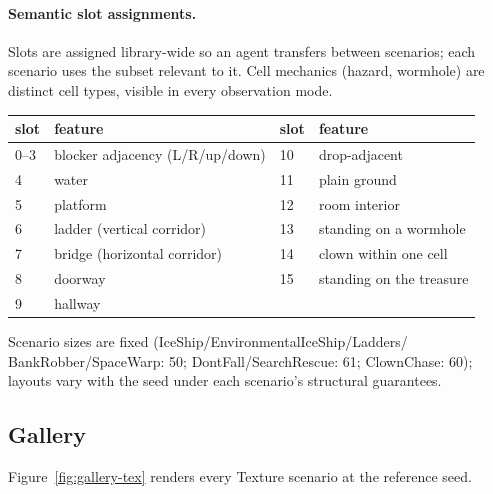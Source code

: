 \documentclass[11pt]{article}
\begin{document}
\paragraph{Semantic slot assignments.} Slots are assigned
library-wide so an agent transfers between scenarios; each scenario
uses the subset relevant to it. Cell mechanics (hazard, wormhole) are
distinct cell types, visible in every observation mode.

\begin{center}
\small
\begin{tabular}{@{}llll@{}}
\toprule
\textbf{slot} & \textbf{feature} & \textbf{slot} & \textbf{feature} \\
\midrule
0--3 & blocker adjacency (L/R/up/down) & 10 & drop-adjacent \\
4 & water & 11 & plain ground \\
5 & platform & 12 & room interior \\
6 & ladder (vertical corridor) & 13 & standing on a wormhole \\
7 & bridge (horizontal corridor) & 14 & clown within one cell \\
8 & doorway & 15 & standing on the treasure \\
9 & hallway & & \\
\bottomrule
\end{tabular}
\end{center}

Scenario sizes are fixed (IceShip/EnvironmentalIceShip/Ladders/%
BankRobber/SpaceWarp: 50; DontFall/SearchRescue: 61; ClownChase: 60); layouts vary with the seed under each
scenario's structural guarantees.

\subsection{Gallery}

Figure~\ref{fig:gallery-tex} renders every Texture scenario at the reference seed.
\end{document}
